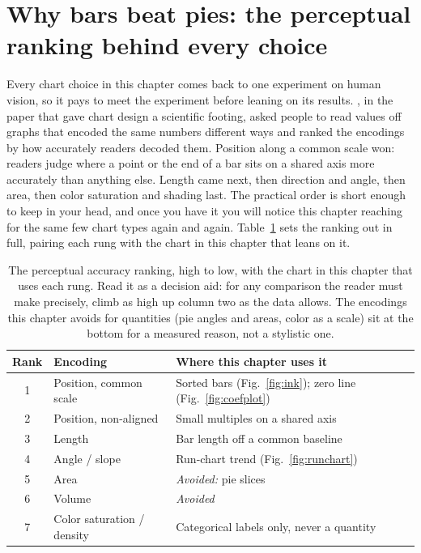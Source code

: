 \documentclass[
    a4paper,
    fontsize=10pt,
    twoside=true,
    numbers=noenddot,
]{kaobook}
\begin{document}
\section{Why bars beat pies: the perceptual ranking behind every choice}\label{sec:perception}
Every chart choice in this chapter comes back to one experiment on human vision, so it pays to meet the experiment before leaning on its results. \textcite{cleveland1984graphical}, in the paper that gave chart design a scientific footing, asked people to read values off graphs that encoded the same numbers different ways and ranked the encodings by how accurately readers decoded them. Position along a common scale won: readers judge where a point or the end of a bar sits on a shared axis more accurately than anything else. Length came next, then direction and angle, then area, then color saturation and shading last. The practical order is short enough to keep in your head, and once you have it you will notice this chapter reaching for the same few chart types again and again. Table~\ref{tab:ch09-viz-ranking} sets the ranking out in full, pairing each rung with the chart in this chapter that leans on it.

\begin{table}[htbp]
\centering
\caption[The Cleveland--McGill encoding ranking, mapped to this chapter]{The perceptual accuracy ranking, high to low, with the chart in this chapter that uses each rung. Read it as a decision aid: for any comparison the reader must make precisely, climb as high up column two as the data allows. The encodings this chapter avoids for quantities (pie angles and areas, color as a scale) sit at the bottom for a measured reason, not a stylistic one.}
\label{tab:ch09-viz-ranking}
\footnotesize
\begin{tabular}{@{}clp{9.6cm}@{}}
\toprule
Rank & Encoding & Where this chapter uses it \\
\midrule
1 & Position, common scale     & Sorted bars (Fig.~\ref{fig:ink}); zero line (Fig.~\ref{fig:coefplot}) \\
2 & Position, non-aligned      & Small multiples on a shared axis \\
3 & Length                     & Bar length off a common baseline \\
4 & Angle / slope              & Run-chart trend (Fig.~\ref{fig:runchart}) \\
5 & Area                       & \emph{Avoided:} pie slices \\
6 & Volume                     & \emph{Avoided} \\
7 & Color saturation / density & Categorical labels only, never a quantity \\
\bottomrule
\end{tabular}
\end{table}
\end{document}
